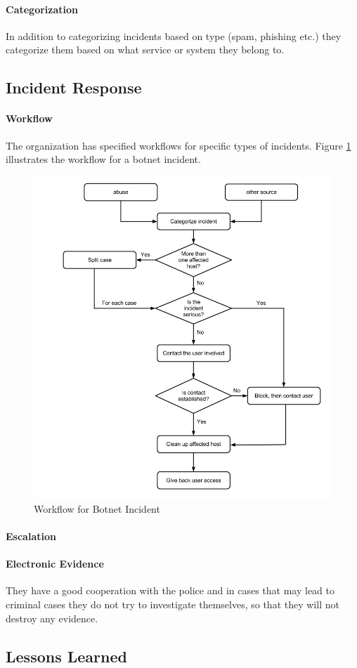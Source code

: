 \paragraph{Categorization}
In addition to categorizing incidents based on type (spam, phishing etc.) they categorize them based on what service or system they belong to.

\subsection{Incident Response}

\paragraph{Workflow}
The organization has specified workflows for specific types of incidents. Figure \ref{fig:WorkflowCaseABotnet} illustrates the workflow for a botnet incident.

\begin{figure}[H]
\hspace{-1.1cm}\includegraphics[scale=0.53]{WorkflowCaseABotnet.png}
\caption[Workflow for Botnet Incident, Case B]{Workflow for Botnet Incident}
\label{fig:WorkflowCaseABotnet}
\end{figure}

\paragraph{Escalation}

\paragraph{Electronic Evidence}
They have a good cooperation with the police and in cases that may lead to criminal cases they do not try to investigate themselves, so that they will not destroy any evidence. %

\subsection{Lessons Learned}